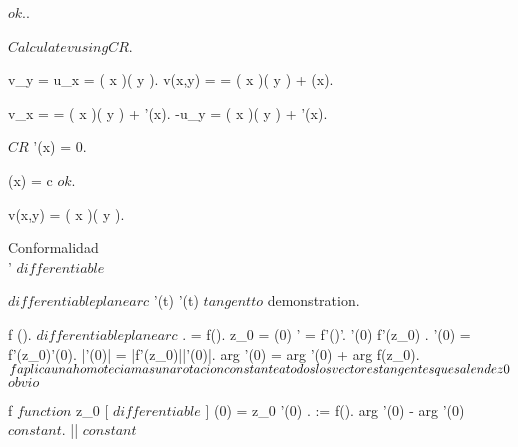 \documentclass[../Main/main]{subfiles}
\begin{document}
{{{			$ok$..

			$ Calculate v using CR $.

			v_y = u_x = \exp( x )\cos( y ).
			v(x,y) =  = \exp( x )\sin( y ) + \phi(x).

			v_x =  = \exp( x )\sin( y ) + \phi'(x).
			-u_y = \exp( x )\sin( y ) + \phi'(x).

			$CR$ \imp \phi'(x) = 0.

			{
				\phi(x) = c $ ok $.
			}

			v(x,y) = \exp( x )\sin( y ).



		}
	}
	
	
	
	
	
	
	Conformalidad \\

	{
		{
		}
		{
		}
		\denote
		{
			\exists \gamma' \as \gamma $ differentiable $
		}
	}
	
	
	{
		{
			\gamma $ differentiable plane arc $ \suchthat {}
			{
				\gamma'(t) 
			}
		}
		\holds
		{
			\gamma'(t) $ tangent to $ \gamma
		}
		\demonstration
		{
			demonstration.
		}
	}
	
	
	{
		{
			f \in \Hc(\Uc).
			\gamma $ differentiable plane arc $ \suchthat \gamma \subset \Uc.
			\sigma = f(\gamma).
			z_0 = \gamma(0)
		}
		\holds
		{
			\sigma' = f'(\gamma)\gamma'.
			\gamma'(0)  \imp f'(z_0) .
			\sigma'(0) = f'(z_0)\gamma'(0).
			|\sigma'(0)| = |f'(z_0)||\gamma'(0)|.
			arg \sigma'(0) = arg \gamma'(0) + arg f(z_0).
			$ f aplica una homotecia mas una rotacion constante a todos los \\ vectores tangentes que salen de z0 $
		}
		\demonstration
		{
			$obvio$
		}
	}


	{
		{
			f $ function $
			z_0 \in \Uc
		}
		{
			[ \gamma $ differentiable $ ]
			{
				\gamma(0) = z_0 \gamma'(0) .
				\sigma := f(\gamma).
				arg \sigma'(0) - arg \gamma'(0) $ constant $.
				|| $ constant $
			}
		}
	}
	
}
\end{document}
